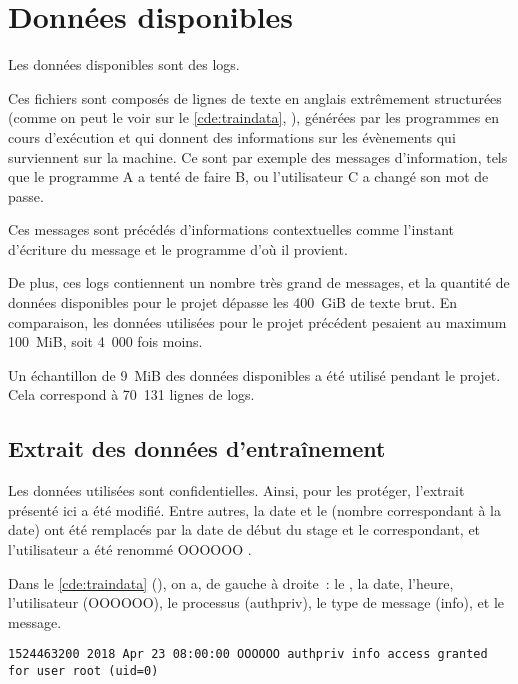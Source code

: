 \chapter{Données disponibles}\label{ch:data_papud}
Les données disponibles sont des \glspl{log}. \label{def:log}

Ces fichiers sont composés de lignes de texte en anglais extrêmement structurées (comme on peut le voir sur le \autoref{cde:traindata}, ), générées par les programmes en cours d'exécution et qui donnent des informations sur les évènements qui surviennent sur la machine.
Ce sont par exemple des messages d'information, tels que \og le programme A a tenté de faire B\fg{}, ou \og l'utilisateur C a changé son mot de passe\fg{}.

Ces messages sont précédés d'informations contextuelles comme l'instant d'écriture du message et le programme d'où il provient.

De plus, ces \glspl{log} contiennent un nombre très grand de messages, et la quantité de données disponibles pour le projet dépasse les 400~GiB de texte brut. En comparaison, les données utilisées pour le projet précédent pesaient au maximum 100~MiB, soit 4~000 fois moins.

Un échantillon de 9~MiB des données disponibles a été utilisé pendant le projet.
Cela correspond à 70~131 lignes de \glspl{log}.

\section{Extrait des données d'entraînement}%
Les données utilisées sont confidentielles.
Ainsi, pour les protéger, l'extrait présenté ici a été modifié.
Entre autres, la date et le  (nombre correspondant à la date) ont été remplacés par la date de début du stage et le  correspondant, et l'utilisateur a été renommé \og OOOOOO \fg{}.

Dans le \autoref{cde:traindata} (), on a, de gauche à droite~: le , la date, l'heure, l'utilisateur (OOOOOO), le processus (authpriv), le type de message (info), et le message.

\begin{lstlisting}[caption={Exemple de ligne extraite d'un des fichiers de journalisation},label=cde:traindata]
	1524463200 2018 Apr 23 08:00:00 OOOOOO authpriv info access granted for user root (uid=0)
\end{lstlisting}

